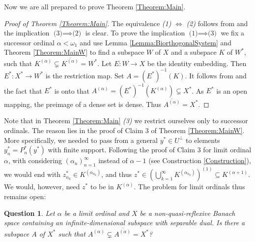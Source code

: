 \documentclass{amsart}
\newtheorem{question}{Question}
\theoremstyle{definition}
\begin{document}
Now we are all prepared to prove Theorem \ref{Theorem:Main}.

\begin{proof}[Proof of Theorem \ref{Theorem:Main}]
    The equivalence \textit{(1)} $\iff$ \textit{(2)} follows from \cite[Theorem 1]{Ostrovskii2011} and the implication $\textit{(3)} \implies \textit{(2)}$ is clear. To prove the implication $\textit{(1)} \implies \textit{(3)}$ we fix a successor ordinal $\alpha < \omega_1$ and use Lemma \ref{Lemma:BiorthogonalSystem} and Theorem \ref{Theorem:MainW} to find a subspace $W$ of $X$ and a subspace $K$ of $W^*$, such that $K^{(\alpha)} \subsetneq \overline{K^{(\alpha)}} = W^*$. Let $E: W \rightarrow X$ be the identity embedding. Then $E^*:X^* \rightarrow W^*$ is the restriction map. Set $A = (E^*)^{-1}(K)$. It follows from \cite[Lemma 1]{Ostrovskii1987} and the fact that $E^*$ is onto that $A^{(\alpha)} = (E^*)^{-1}(K^{(\alpha)}) \subsetneq X^*$. As $E^*$ is an open mapping, the preimage of a dense set is dense. Thus $\overline{A^{(\alpha)}} = X^*$.
\end{proof}

Note that in Theorem \ref{Theorem:Main} \textit{(3)} we restrict ourselves only to successor ordinals. The reason lies in the proof of Claim 3 of Theorem \ref{Theorem:MainW}. More specifically, we needed to pass from a general $y^* \in U^\perp$ to elements $y_n^* = P_n^*(y^*)$ with finite support. Following the proof of Claim 3 for limit ordinal $\alpha$, with considering $(\alpha_n)_{n=1}^\infty$ instead of $\alpha-1$ (see Construction \ref{Construction}), we would end with $z_{n_k}^* \in K^{(\alpha_{n_k})}$, and thus $z^* \in \left(\bigcup_{k=1}^\infty K^{(\alpha_{n_k})} \right)^{(1)} \subseteq K^{(\alpha + 1)}$. We would, however, need $z^*$ to be in $K^{(\alpha)}$. The problem for limit ordinals thus remains open:

\begin{question}
    Let $\alpha$ be a limit ordinal and $X$ be a non-quasi-reflexive Banach space containing an infinite-dimensional subspace with separable dual. Is there a subspace $A$ of $X^*$ such that $A^{(\alpha)} \subsetneq \overline{A^{(\alpha)}} = X^*$?
\end{question}



\end{document}
